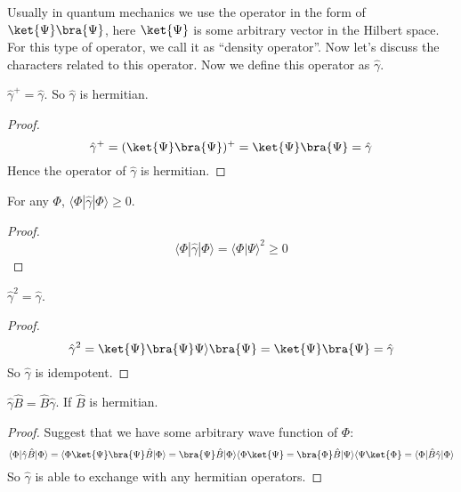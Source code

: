 Usually in quantum mechanics we use the operator in the form of
$\ket{\Psi}\bra{\Psi}$, here $\ket{\Psi}$ is some arbitrary vector
in the Hilbert space. For this type of operator, we call it as
``density operator''. Now let's discuss the characters related to
this operator. Now we define this operator as $\hat{\gamma}$.

\begin{theorem}\label{}
$\hat{\gamma}^{+} = \hat{\gamma}$. So $\hat{\gamma}$ is hermitian.
\end{theorem}

\begin{proof}
\begin{equation}\label{}
\hat{\gamma}^{+} = (\ket{\Psi}\bra{\Psi})^{+} = \ket{\Psi}\bra{\Psi}
= \hat{\gamma}
\end{equation}
Hence the operator of $\hat{\gamma}$ is hermitian. \qedhere
\end{proof}

\begin{theorem}\label{}
For any $\Phi$, $\langle\Phi|\hat{\gamma}|\Phi\rangle \geq 0$.
\end{theorem}

\begin{proof}
\begin{equation}\label{}
\langle\Phi|\hat{\gamma}|\Phi\rangle = \langle\Phi|\Psi\rangle^{2}
\geq 0
\end{equation}
\qedhere
\end{proof}

\begin{theorem}\label{}
$\hat{\gamma}^{2} = \hat{\gamma}$.
\end{theorem}

\begin{proof}
\begin{equation}\label{}
\hat{\gamma}^{2} = \ket{\Psi}\bra{\Psi}\Psi\rangle\bra{\Psi} =
\ket{\Psi}\bra{\Psi} = \hat{\gamma}
\end{equation}
So $\hat{\gamma}$ is idempotent. \qedhere
\end{proof}

\begin{theorem}\label{}
$\hat{\gamma}\hat{B} = \hat{B}\hat{\gamma}$. If $\hat{B}$ is
hermitian.
\end{theorem}

\begin{proof}
Suggest that we have some arbitrary wave function of $\Phi$:
\begin{equation}\label{}
\langle\Phi|\hat{\gamma}\hat{B}|\Phi\rangle =
\langle\Phi\ket{\Psi}\bra{\Psi}\hat{B}|\Phi\rangle =
\bra{\Psi}\hat{B}|\Phi\rangle\langle\Phi\ket{\Psi} =
\bra{\Phi}\hat{B}|\Psi\rangle\langle\Psi\ket{\Phi} =
\langle\Phi|\hat{B}\hat{\gamma}|\Phi\rangle
\end{equation}
So $\hat{\gamma}$ is able to exchange with any hermitian operators.
\qedhere
\end{proof}

